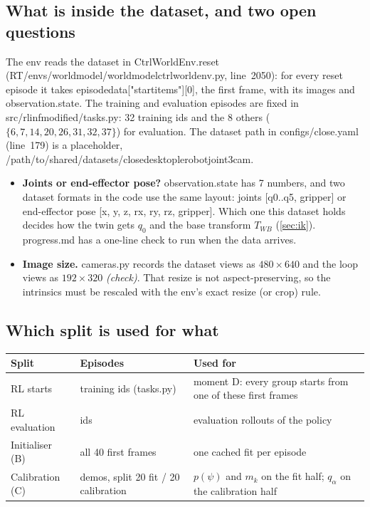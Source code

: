 \documentclass[11pt,a4paper]{article}
\newcommand{\chk}{\textit{(check)}}
\newcommand{\code}[1]{{\small\ttfamily\begingroup\def\_{\textunderscore\allowbreak}\def\/{/\allowbreak}#1\endgroup}}
\begin{document}
\subsection{What is inside the dataset, and two open questions}
The env reads the dataset in \code{CtrlWorldEnv.reset} (\code{RT\/envs\/world\_model\/world\_model\_ctrl\_world\_env.py}, line~2050): for every reset episode it takes \code{episode\_data["start\_items"][0]}, the first frame, with its images and \code{observation.state}. The training and evaluation episodes are fixed in \code{src\/rlinf\_modified\/tasks.py}: 32 training ids and the 8 others ($\{6,7,14,20,26,31,32,37\}$) for evaluation. The dataset path in \code{configs/close.yaml} (line~179) is a placeholder, \code{\/path\/to\/shared\/datasets\/close\_desktop\_lerobot\_joint\_3cam}.

\begin{itemize}
\item \textbf{Joints or end-effector pose?} \code{observation.state} has 7 numbers, and two dataset formats in the code use the same layout: joints \code{[q0..q5, gripper]} or end-effector pose \code{[x, y, z, rx, ry, rz, gripper]}. Which one this dataset holds decides how the twin gets $q_0$ and the base transform $T_{WB}$ (\cref{sec:ik}). \code{progress.md} has a one-line check to run when the data arrives.
\item \textbf{Image size.} \code{cameras.py} records the dataset views as $480\times640$ and the loop views as $192\times320$ \chk. That resize is not aspect-preserving, so the intrinsics must be rescaled with the env's exact resize (or crop) rule.
\end{itemize}

\subsection{Which split is used for what}
\begin{center}\small
\begin{tabularx}{\linewidth}{@{}>{\raggedright\arraybackslash}p{2.8cm}>{\raggedright\arraybackslash}p{4.6cm}>{\raggedright\arraybackslash}X@{}}
\toprule
\textbf{Split} & \textbf{Episodes} & \textbf{Used for}\\
\midrule
RL starts & 32 training ids (\code{tasks.py}) & moment D: every group starts from one of these first frames\\
RL evaluation & 8 ids & evaluation rollouts of the policy\\
Initialiser (B) & all 40 first frames & one cached fit per episode\\
Calibration (C) & 40 demos, split 20 fit / 20 calibration & $p(\psi)$ and $m_k$ on the fit half; $q_\alpha$ on the calibration half\\
\bottomrule
\end{tabularx}
\end{center}
\end{document}
